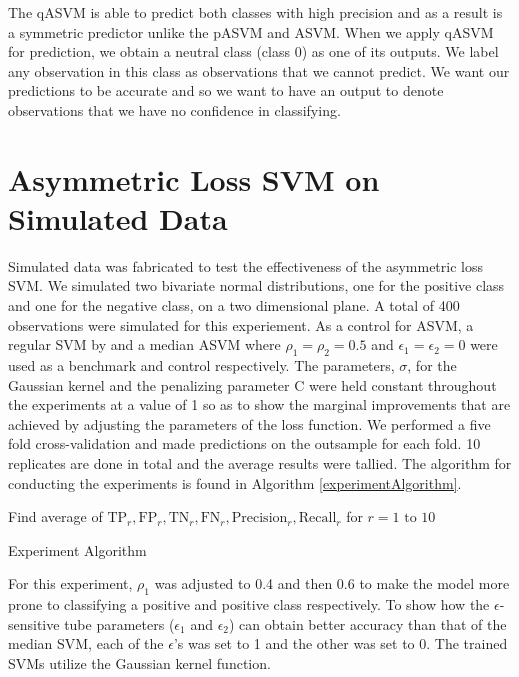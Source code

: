 \documentclass[twoside,11pt]{article}
\begin{document}
The qASVM is able to predict both classes with high precision and as a result is a symmetric predictor unlike the pASVM and ASVM. When we apply qASVM for prediction, we obtain a neutral class (class 0) as one of its outputs. We label any observation in this class as observations that we cannot predict. We want our predictions to be accurate and so we want to have an output to denote observations that we have no confidence in classifying.

\section{Asymmetric Loss SVM on Simulated Data}\label{simulation}
Simulated data was fabricated to test the effectiveness of the asymmetric loss SVM. We simulated two bivariate normal distributions, one for the positive class and one for the negative class, on a two dimensional plane. A total of 400 observations were simulated for this experiement. As a control for ASVM, a regular SVM by \citet{Vapnik98} and a median ASVM where $\rho_1=\rho_2=0.5$ and $\epsilon_1=\epsilon_2=0$ were used as a benchmark and control respectively. The parameters, $\sigma$, for the Gaussian kernel and the penalizing parameter C were held constant throughout the experiments at a value of 1 so as to show the marginal improvements that are achieved by adjusting the parameters of the loss function. We performed a five fold cross-validation and made predictions on the outsample for each fold. 10 replicates are done in total and the average results were tallied. The algorithm for conducting the experiments is found in Algorithm \ref{experimentAlgorithm}.
\begin{algorithm}
Find average of $\text{TP}_r,\text{FP}_r,\text{TN}_r,\text{FN}_r,\text{Precision}_r, \text{Recall}_r$ for $r=1 \text{ to } 10$
\caption{Experiment Algorithm}\label{experimentAlgorithm}
\end{algorithm}
 For this experiment, $\rho_1$ was adjusted to 0.4 and then 0.6 to make the model more prone to classifying a positive and positive class respectively. To show how the $\epsilon$-sensitive tube parameters ($\epsilon_1$ and $\epsilon_2$) can obtain better accuracy than that of the median SVM, each of the $\epsilon$'s was set to 1 and the other was set to 0. The trained SVMs utilize the Gaussian kernel function. 
\end{document}
